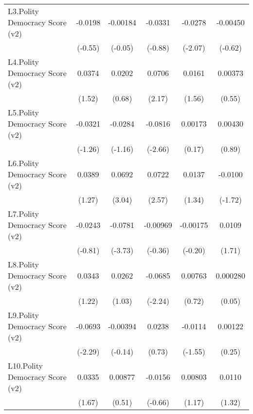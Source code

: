 {\begin{longtable}{l*{5}{c}}
\addlinespace
L3.Polity Democracy Score (v2)&  -0.0198         & -0.00184         &  -0.0331         &  -0.0278\sym{*}  & -0.00450         \\
                &  (-0.55)         &  (-0.05)         &  (-0.88)         &  (-2.07)         &  (-0.62)         \\
\addlinespace
L4.Polity Democracy Score (v2)&   0.0374         &   0.0202         &   0.0706\sym{*}  &   0.0161         &  0.00373         \\
                &   (1.52)         &   (0.68)         &   (2.17)         &   (1.56)         &   (0.55)         \\
\addlinespace
L5.Polity Democracy Score (v2)&  -0.0321         &  -0.0284         &  -0.0816\sym{**} &  0.00173         &  0.00430         \\
                &  (-1.26)         &  (-1.16)         &  (-2.66)         &   (0.17)         &   (0.89)         \\
\addlinespace
L6.Polity Democracy Score (v2)&   0.0389         &   0.0692\sym{**} &   0.0722\sym{*}  &   0.0137         &  -0.0100         \\
                &   (1.27)         &   (3.04)         &   (2.57)         &   (1.34)         &  (-1.72)         \\
\addlinespace
L7.Polity Democracy Score (v2)&  -0.0243         &  -0.0781\sym{***}& -0.00969         & -0.00175         &   0.0109         \\
                &  (-0.81)         &  (-3.73)         &  (-0.36)         &  (-0.20)         &   (1.71)         \\
\addlinespace
L8.Polity Democracy Score (v2)&   0.0343         &   0.0262         &  -0.0685\sym{*}  &  0.00763         & 0.000280         \\
                &   (1.22)         &   (1.03)         &  (-2.24)         &   (0.72)         &   (0.05)         \\
\addlinespace
L9.Polity Democracy Score (v2)&  -0.0693\sym{*}  & -0.00394         &   0.0238         &  -0.0114         &  0.00122         \\
                &  (-2.29)         &  (-0.14)         &   (0.73)         &  (-1.55)         &   (0.25)         \\
\addlinespace
L10.Polity Democracy Score (v2)&   0.0335         &  0.00877         &  -0.0156         &  0.00803         &   0.0110         \\
                &   (1.67)         &   (0.51)         &  (-0.66)         &   (1.17)         &   (1.32)         \\

\end{longtable}}
